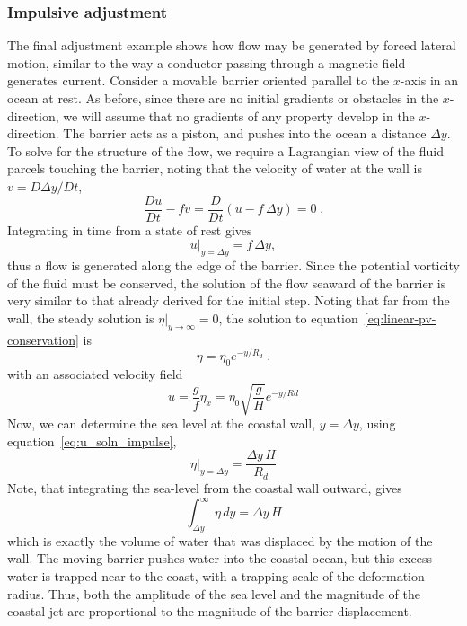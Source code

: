 \documentclass[11pt]{report}
\numberwithin{equation}{section}
\begin{document}
\subsubsection{Impulsive adjustment}
The final adjustment example shows how flow may be generated by forced lateral motion, similar to the way a conductor passing through a magnetic field generates current.  Consider a movable barrier oriented parallel to the $x$-axis in an ocean at rest.  As before, since there are no initial gradients or obstacles in the $x$-direction, we will assume that no gradients of any property develop in the $x$-direction.  The barrier acts as a piston, and pushes into the ocean a distance $\Delta y$.  To solve for the structure of the flow, we require a Lagrangian view of the fluid parcels touching the barrier, noting that the velocity of water at the wall is $v = D \Delta y /Dt$,
\begin{equation}
    \frac{Du}{Dt} - fv = \frac{D}{Dt}\left( u - f\,\Delta y \right) = 0 \; .
\end{equation}
Integrating in time from a state of rest gives 
\begin{equation}
    \label{eq:u_soln_impulse}
    u|_{y=\Delta y} = f\,\Delta y,
\end{equation}
thus a flow is generated along the edge of the barrier.  Since the potential vorticity of the fluid must be conserved, the solution of the flow seaward of the barrier is very similar to that already derived for the initial step.  Noting that far from the wall, the steady solution is $\eta|_{y\rightarrow\infty}=0$, the solution to equation~\ref{eq:linear-pv-conservation} is
\begin{equation}
    \eta = \eta_0 e^{-y/R_d} \; .
\end{equation}
with an associated velocity field
\begin{equation}
    u = \frac{g}{f}\eta_x = \eta_0 \sqrt{\frac{g}{H}} e^{-y/Rd}
\end{equation}
Now, we can determine the sea level at the coastal wall, $y = \Delta y$, using equation~\ref{eq:u_soln_impulse},
\begin{equation}
    \eta|_{y=\Delta y} = \frac{\Delta y\,H}{R_d}
\end{equation}
Note, that integrating the sea-level from the coastal wall outward, gives
\begin{equation}
    \int_{\Delta y}^{\infty} \eta\,dy = \Delta y\, H
\end{equation}
which is exactly the volume of water that was displaced by the motion of the wall.  The moving barrier pushes water into the coastal ocean, but this excess water is trapped near to the coast, with a trapping scale of the deformation radius.  Thus, both the amplitude of the sea level and the magnitude of the coastal jet are proportional to the magnitude of the barrier displacement.
\end{document}
